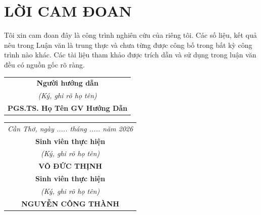 \chapter*{LỜI CAM ĐOAN}
\vspace{-15pt} %

Tôi xin cam đoan đây là công trình nghiên cứu của riêng tôi. Các số liệu, kết quả nêu trong Luận văn là trung thực và chưa từng được công bố trong bất kỳ công trình nào khác. Các tài liệu tham khảo được trích dẫn và sử dụng trong luận văn đều có nguồn gốc rõ ràng.


\vfill %

\noindent %
\begin{tabular}{@{}c@{}}
    \textbf{Người hướng dẫn}\\
    \textit{(Ký, ghi rõ họ tên)} \\[2cm] %
    \textbf{PGS.TS. Họ Tên GV Hướng Dẫn}
\end{tabular}
\hfill %
\begin{tabular}{@{}c@{}}
    \textit{Cần Thơ, ngày ..... tháng ..... năm 2026} \\[0.2cm]
    \textbf{Sinh viên thực hiện}\\
    \textit{(Ký, ghi rõ họ tên)} \\[2cm]
    \textbf{VÕ ĐỨC THỊNH} \\[2cm]
    \textbf{Sinh viên thực hiện}\\
    \textit{(Ký, ghi rõ họ tên)} \\[2cm]
    \textbf{NGUYỄN CÔNG THÀNH}
\end{tabular}